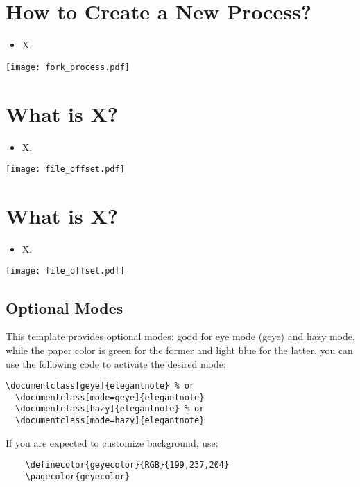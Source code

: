 \documentclass[en,hazy,blue,screen,14pt]{elegantnote}
\begin{document}
\newpage
\section{How to Create a New Process?}
\begin{itemize}
	\item X.
\end{itemize}
\centerline{\texttt{[image: fork\_process.pdf]}}


\newpage
\section{What is X?}
\begin{itemize}
	\item X.
\end{itemize}
\centerline{\texttt{[image: file\_offset.pdf]}}

\newpage
\section{What is X?}
\begin{itemize}
	\item X.
\end{itemize}
\centerline{\texttt{[image: file\_offset.pdf]}}

\newpage
\subsection{Optional Modes}

This template provides optional modes: good for eye mode (geye) and hazy mode, while the paper color is green for the former and light blue for the latter. you can use the following code to activate the desired mode:
\begin{lstlisting}[frame=none]  
  \documentclass[geye]{elegantnote} % or
  \documentclass[mode=geye]{elegantnote}
  \documentclass[hazy]{elegantnote} % or
  \documentclass[mode=hazy]{elegantnote}
\end{lstlisting}

\begin{remark}
  If you are expected to customize background, use:
  \begin{lstlisting}
    \definecolor{geyecolor}{RGB}{199,237,204}
    \pagecolor{geyecolor}
  \end{lstlisting}
\end{remark}
\end{document}
